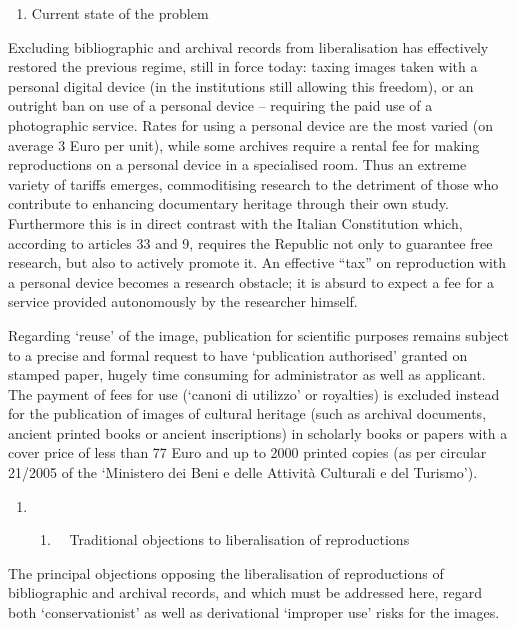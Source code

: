 \documentclass[amsthm,ebook]{saparticle}
\begin{document}
\begin{enumerate}
\item Current state of the problem
\end{enumerate}
Excluding bibliographic and archival records from liberalisation has effectively restored the previous regime, still in
force today: taxing images taken with a personal digital device (in the institutions still allowing this freedom), or
an outright ban on use of a personal device – requiring the paid use of a photographic service. Rates for using a
personal device are the most varied (on average 3 Euro per unit), while some archives require a rental fee for making
reproductions on a personal device in a specialised room. Thus an extreme variety of tariffs emerges, commoditising
research to the detriment of those who contribute to enhancing documentary heritage through their own study.
Furthermore this is in direct contrast with the Italian Constitution which, according to articles 33 and 9, requires
the Republic not only to guarantee free research, but also to actively promote it. An effective “tax” on reproduction
with a personal device becomes a research obstacle; it is absurd to expect a fee for a service provided autonomously by
the researcher himself. 

Regarding ‘reuse’ of the image, publication for scientific purposes remains subject to a precise and formal request to
have ‘publication authorised’ granted on stamped paper, hugely time consuming for administrator as well as applicant.
The payment of fees for use (‘canoni di utilizzo’ or royalties) is excluded instead for the publication of images of
cultural heritage (such as archival documents, ancient printed books or ancient inscriptions) in scholarly books or
papers with a cover price of less than 77 Euro and up to 2000 printed copies (as per circular 21/2005 of the ‘Ministero
dei Beni e delle Attività Culturali e del Turismo’).


\bigskip

\begin{enumerate}
\item \begin{enumerate}
\item \ \ Traditional objections to liberalisation of reproductions
\end{enumerate}
\end{enumerate}
The principal objections opposing the liberalisation of reproductions of bibliographic and archival records, and which
must be addressed here, regard both ‘conservationist’ as well as derivational ‘improper use’ risks for the images.
\end{document}
